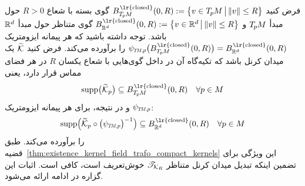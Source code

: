 فرض کنید
$B_{\TpM}^{\mkern1.5mu\textup{\lr{closed}}}(0,R) := \big\{ v\in\TpM \,\big|\, \lVert v\rVert \leq R \big\}$
گوی بسته با شعاع $R>0$ حول مبدأ $T_{\mkern-1.5mu p}\mkern-.5muM$ و
$B_{\R^d}^{\mkern1.5mu\textup{\lr{closed}}}(0,R) := \big\{ v\in\R^d \,\big|\, \lVert v\rVert \leq R \big\}$
گوی متناظر حول مبدأ $\mathbb{R}^d$ باشد.
توجه داشته باشید که هر پیمانه ایزومتریک $\psiTMp\big(B_{\TpM}^{\mkern1.5mu\textup{\lr{closed}}}(0,R)\big) = B_{\R^d}^{\mkern1.5mu\textup{\lr{closed}}}(0,R)$ را برآورده می‌کند.
فرض کنید $\widetilde{\mathcal{K}}$ یک میدان کرنل باشد که تکیه‌گاه آن در داخل گوی‌هایی با شعاع یکسان $R$ در هر فضای مماس قرار دارد، یعنی
\begin{align}
    \supp\!\big(\widetilde{\K}_p\big) \subseteq B_{\TpM}^{\mkern1.5mu\textup{\lr{closed}}}(0,R) \quad \forall p\in M
\end{align}
و در نتیجه، برای هر پیمانه ایزومتریک $\psiTMp$:
\begin{align}
    \supp\! \pig(\widetilde{\K}_p \circ \big(\psiTMp\big)^{-1} \pig) \subseteq B_{\R^d}^{\mkern1.5mu\textup{\lr{closed}}}(0,R) \quad \forall p\in M
\end{align}
را برآورده می‌کند. طبق قضیه~\ref{thm:existence_kernel_field_trafo_compact_kernels} این ویژگی برای تضمین اینکه تبدیل میدان کرنل متناظر $\mathscr{T}_{\mathcal{K}_{\mkern-1muR}}$ خوش‌تعریف است، کافی است.
اثبات این گزاره در ادامه ارائه می‌شود.

